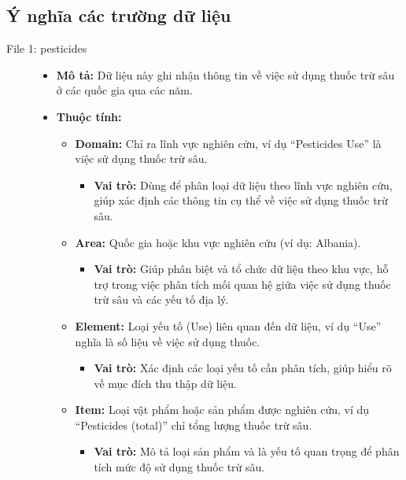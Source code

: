 \subsection{Ý nghĩa các trường dữ liệu}

\begin{description}
    \item[File 1: pesticides]

    \begin{itemize} 
        \item \textbf{Mô tả:} Dữ liệu này ghi nhận thông tin về việc sử dụng thuốc trừ sâu ở các quốc gia qua các năm.
        \item \textbf{Thuộc tính:}
        \begin{itemize}
            \item \textbf{Domain:} Chỉ ra lĩnh vực nghiên cứu, ví dụ ``Pesticides Use'' là việc sử dụng thuốc trừ sâu.
            \begin{itemize}
                \item \textbf{Vai trò:} Dùng để phân loại dữ liệu theo lĩnh vực nghiên cứu, giúp xác định các thông tin cụ thể về việc sử dụng thuốc trừ sâu.
            \end{itemize}
            \item \textbf{Area:} Quốc gia hoặc khu vực nghiên cứu (ví dụ: Albania).
            \begin{itemize}
                \item \textbf{Vai trò:} Giúp phân biệt và tổ chức dữ liệu theo khu vực, hỗ trợ trong việc phân tích mối quan hệ giữa việc sử dụng thuốc trừ sâu và các yếu tố địa lý.
            \end{itemize}
            \item \textbf{Element:} Loại yếu tố (Use) liên quan đến dữ liệu, ví dụ ``Use'' nghĩa là số liệu về việc sử dụng thuốc.
            \begin{itemize}
                \item \textbf{Vai trò:} Xác định các loại yếu tố cần phân tích, giúp hiểu rõ về mục đích thu thập dữ liệu.
            \end{itemize}
            \item \textbf{Item:} Loại vật phẩm hoặc sản phẩm được nghiên cứu, ví dụ ``Pesticides (total)'' chỉ tổng lượng thuốc trừ sâu.
            \begin{itemize}
                \item \textbf{Vai trò:} Mô tả loại sản phẩm và là yếu tố quan trọng để phân tích mức độ sử dụng thuốc trừ sâu.

\end{itemize}
\end{itemize}
\end{itemize}
\end{description}
